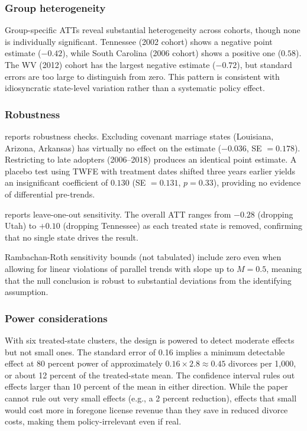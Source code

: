 \documentclass[12pt]{article}
\begin{document}


\subsubsection*{Group heterogeneity} Group-specific ATTs reveal substantial heterogeneity across cohorts, though none is individually significant. Tennessee (2002 cohort) shows a negative point estimate ($-0.42$), while South Carolina (2006 cohort) shows a positive one ($0.58$). The WV (2012) cohort has the largest negative estimate ($-0.72$), but standard errors are too large to distinguish from zero. This pattern is consistent with idiosyncratic state-level variation rather than a systematic policy effect.

\subsubsection*{Robustness}  reports robustness checks. Excluding covenant marriage states (Louisiana, Arizona, Arkansas) has virtually no effect on the estimate ($-0.036$, SE $= 0.178$). Restricting to late adopters (2006--2018) produces an identical point estimate. A placebo test using TWFE with treatment dates shifted three years earlier yields an insignificant coefficient of $0.130$ (SE $= 0.131$, $p = 0.33$), providing no evidence of differential pre-trends.



 reports leave-one-out sensitivity. The overall ATT ranges from $-0.28$ (dropping Utah) to $+0.10$ (dropping Tennessee) as each treated state is removed, confirming that no single state drives the result.



Rambachan-Roth sensitivity bounds (not tabulated) include zero even when allowing for linear violations of parallel trends with slope up to $M = 0.5$, meaning that the null conclusion is robust to substantial deviations from the identifying assumption.

\subsubsection*{Power considerations} With six treated-state clusters, the design is powered to detect moderate effects but not small ones. The standard error of 0.16 implies a minimum detectable effect at 80 percent power of approximately $0.16 \times 2.8 \approx 0.45$ divorces per 1,000, or about 12 percent of the treated-state mean. The confidence interval rules out effects larger than 10 percent of the mean in either direction. While the paper cannot rule out very small effects (e.g., a 2 percent reduction), effects that small would cost more in foregone license revenue than they save in reduced divorce costs, making them policy-irrelevant even if real.
\end{document}
